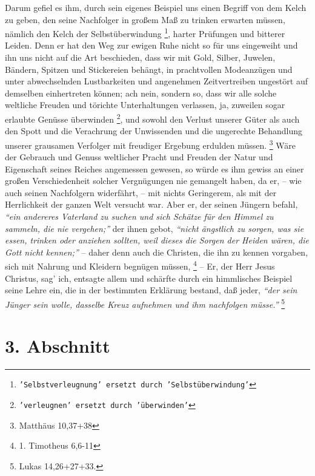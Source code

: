 Darum gefiel es ihm, durch sein eigenes Beispiel uns einen Begriff von dem
Kelch zu geben, den seine Nachfolger in großem Maß zu trinken erwarten müssen,
nämlich den Kelch der Selbstüberwindung
\footnote{\texttt{'Selbstverleugnung' ersetzt durch 'Selbstüberwindung'}},
harter Prüfungen und bitterer Leiden.
Denn er hat den Weg zur ewigen Ruhe nicht so für uns eingeweiht und ihn uns
nicht auf die Art beschieden, dass wir mit Gold, Silber, Juwelen, Bändern,
Spitzen und Stickereien behängt, in prachtvollen Modeanzügen und unter
abwechselnden Lustbarkeiten und angenehmen Zeitvertreiben ungestört auf
demselben einhertreten können; ach nein, sondern so, dass wir alle solche
weltliche Freuden und törichte Unterhaltungen verlassen, ja, zuweilen sogar
erlaubte Genüsse überwinden
\footnote{\texttt{'verleugnen' ersetzt durch 'überwinden'}},
und sowohl den Verlust unserer Güter als auch den
Spott und die Verachrung der Unwissenden und die ungerechte Behandlung unserer
grausamen Verfolger mit freudiger Ergebung erdulden müssen.
\footnote{Matthäus 10,37+38 }
Wäre der Gebrauch und Genuss weltlicher Pracht und Freuden der Natur
und Eigenschaft seines Reiches angemessen gewesen, so würde es ihm gewiss an
einer großen Verschiedenheit solcher Vergnügungen nie gemangelt haben, da er, --
wie auch seinen Nachfolgern widerfährt, -- mit nichts Geringerem, als mit der
Herrlichkeit der ganzen Welt versucht war. Aber er, der seinen Jüngern befahl,
\textit{"`ein andereres Vaterland zu suchen und sich Schätze für den Himmel zu
sammeln, die nie vergehen;"'} der ihnen gebot,
\textit{"`nicht ängstlich zu sorgen, was sie essen,
trinken oder anziehen sollten, weil dieses die Sorgen der Heiden wären,
die Gott nicht kennen;"'} -- daher denn auch die Christen, die ihn zu kennen
vorgaben, sich mit Nahrung und Kleidern begnügen müssen,
\footnote{1. Timotheus 6,6-11}
-- Er, der Herr Jesus Christus, sag’ ich, entsagte allem und schärfte
durch ein himmlisches Beispiel seine Lehre ein, die in der bestimmten Erklärung
bestand, daß jeder,
\textit{"`der sein Jünger sein wolle, dasselbe Kreuz aufnehmen und
ihm nachfolgen müsse."'}
\footnote{Lukas 14,26+27+33.}

\section{3. Abschnitt} \label{kap16_ab3}

